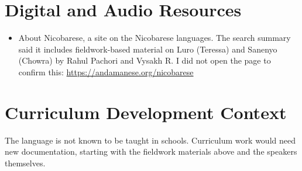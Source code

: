 \documentclass[12pt]{article}
\begin{document}
\section{Digital and Audio Resources}
\begin{itemize}
\item About Nicobarese, a site on the Nicobarese languages. The search summary said it includes fieldwork-based material on Luro (Teressa) and Sanenyo (Chowra) by Rahul Pachori and Vysakh R. I did not open the page to confirm this: \url{https://andamanese.org/nicobarese}
\end{itemize}

\section{Curriculum Development Context}
The language is not known to be taught in schools. Curriculum work would need new documentation, starting with the fieldwork materials above and the speakers themselves.
\end{document}

